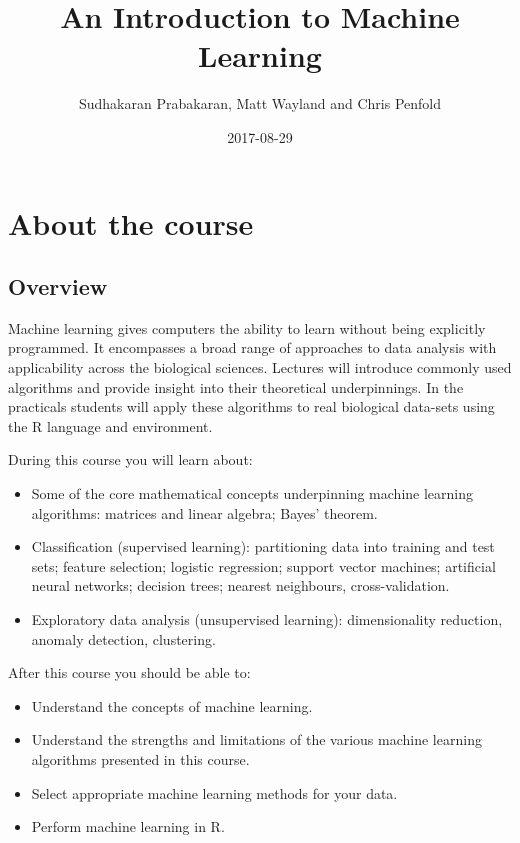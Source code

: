 \documentclass[]{book}
\title{An Introduction to Machine Learning}
\author{Sudhakaran Prabakaran, Matt Wayland and Chris Penfold}
\date{2017-08-29}
\providecommand{\tightlist}{%
  \setlength{\itemsep}{0pt}\setlength{\parskip}{0pt}}
\theoremstyle{definition}
\theoremstyle{definition}
\theoremstyle{definition}
\theoremstyle{remark}
\begin{document}
\maketitle

{
\setcounter{tocdepth}{1}
\tableofcontents
}
\chapter{About the course}\label{about-the-course}

\section{Overview}\label{overview}

Machine learning gives computers the ability to learn without being
explicitly programmed. It encompasses a broad range of approaches to
data analysis with applicability across the biological sciences.
Lectures will introduce commonly used algorithms and provide insight
into their theoretical underpinnings. In the practicals students will
apply these algorithms to real biological data-sets using the R language
and environment.

During this course you will learn about:

\begin{itemize}
\tightlist
\item
  Some of the core mathematical concepts underpinning machine learning
  algorithms: matrices and linear algebra; Bayes' theorem.
\item
  Classification (supervised learning): partitioning data into training
  and test sets; feature selection; logistic regression; support vector
  machines; artificial neural networks; decision trees; nearest
  neighbours, cross-validation.
\item
  Exploratory data analysis (unsupervised learning): dimensionality
  reduction, anomaly detection, clustering.
\end{itemize}

After this course you should be able to:

\begin{itemize}
\tightlist
\item
  Understand the concepts of machine learning.
\item
  Understand the strengths and limitations of the various machine
  learning algorithms presented in this course.
\item
  Select appropriate machine learning methods for your data.
\item
  Perform machine learning in R.
\end{itemize}
\end{document}
